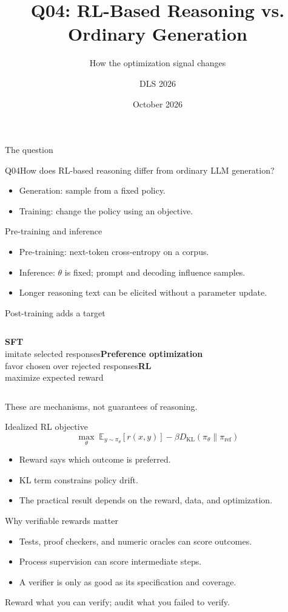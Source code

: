 \documentclass[aspectratio=169,10pt]{beamer}\usetheme{metropolis}
\title{Q04: RL-Based Reasoning vs. Ordinary Generation}\subtitle{How the optimization signal changes}\author{DLS 2026}\date{October 2026}
\begin{document}
\maketitle
\begin{frame}{The question}\begin{block}{Q04}How does RL-based reasoning differ from ordinary LLM generation?\end{block}\begin{itemize}\item Generation: sample from a fixed policy.\item Training: change the policy using an objective.\end{itemize}\end{frame}
\begin{frame}{Pre-training and inference}\begin{itemize}\item Pre-training: next-token cross-entropy on a corpus.\item Inference: $\theta$ is fixed; prompt and decoding influence samples.\item Longer reasoning text can be elicited without a parameter update.\end{itemize}\end{frame}
\begin{frame}{Post-training adds a target}\begin{columns}\textbf{SFT}\\imitate selected responses\textbf{Preference optimization}\\favor chosen over rejected responses\textbf{RL}\\maximize expected reward\end{columns}\vfill These are mechanisms, not guarantees of reasoning.\end{frame}
\begin{frame}{Idealized RL objective}\[\max_\theta\;\mathbb E_{y\sim\pi_\theta}[r(x,y)]-\beta D_{\mathrm{KL}}(\pi_\theta\|\pi_{\mathrm{ref}})\]\begin{itemize}\item Reward says which outcome is preferred.\item KL term constrains policy drift.\item The practical result depends on the reward, data, and optimization.\end{itemize}\end{frame}
\begin{frame}{Why verifiable rewards matter}\begin{itemize}\item Tests, proof checkers, and numeric oracles can score outcomes.\item Process supervision can score intermediate steps.\item A verifier is only as good as its specification and coverage.\end{itemize}\alert{Reward what you can verify; audit what you failed to verify.}\end{frame}
\end{document}
